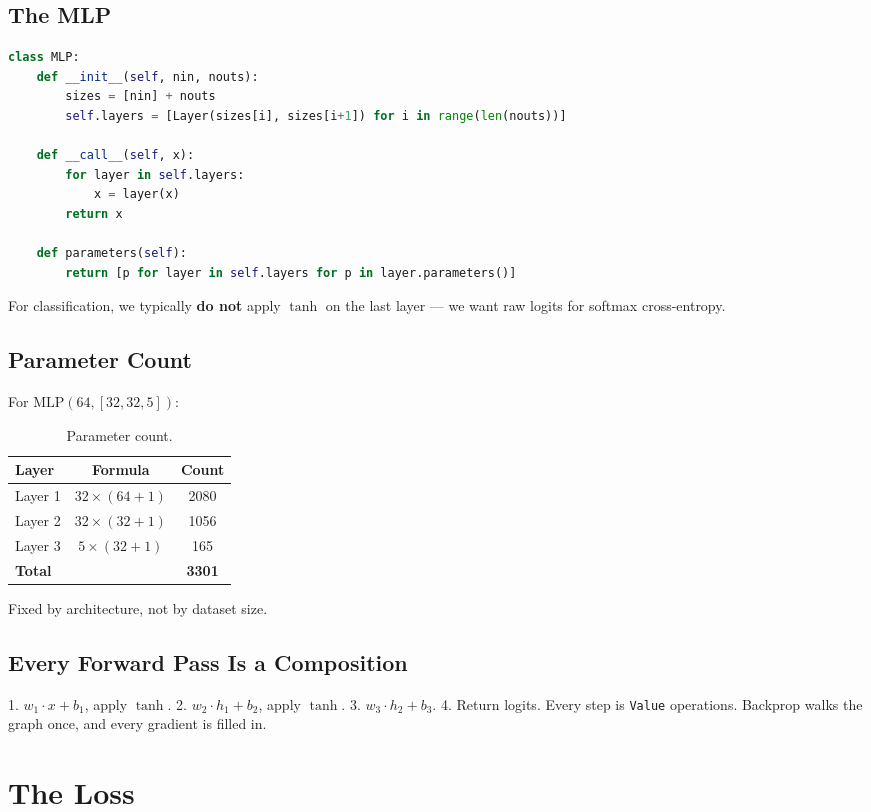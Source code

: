 \documentclass[11pt,a4paper]{book}
\begin{document}
\section{The MLP}

\begin{lstlisting}[language=Python, frame=single, caption={The MLP}]
class MLP:
    def __init__(self, nin, nouts):
        sizes = [nin] + nouts
        self.layers = [Layer(sizes[i], sizes[i+1]) for i in range(len(nouts))]

    def __call__(self, x):
        for layer in self.layers:
            x = layer(x)
        return x

    def parameters(self):
        return [p for layer in self.layers for p in layer.parameters()]
\end{lstlisting}
For classification, we typically \textbf{do not} apply $\tanh$ on the last layer --- we want raw logits for softmax cross-entropy.

\section{Parameter Count}

For $\text{MLP}(64, [32, 32, 5])$:
\begin{table}[H]
\centering
\caption{Parameter count.}
\begin{tabular}{@{}lcc@{}}
\toprule
Layer & Formula & Count \\
\midrule
Layer 1 & $32 \times (64+1)$ & 2080 \\
Layer 2 & $32 \times (32+1)$ & 1056 \\
Layer 3 & $5 \times (32+1)$ & 165 \\
\midrule
\textbf{Total} & & \textbf{3301} \\
\bottomrule
\end{tabular}
\end{table}
Fixed by architecture, not by dataset size.

\section{Every Forward Pass Is a Composition}

1. $w_1 \cdot x + b_1$, apply $\tanh$.
2. $w_2 \cdot h_1 + b_2$, apply $\tanh$.
3. $w_3 \cdot h_2 + b_3$.
4. Return logits.
Every step is \texttt{Value} operations. Backprop walks the graph once, and every gradient is filled in.

\chapter{The Loss}\label{ch:loss}
\end{document}
